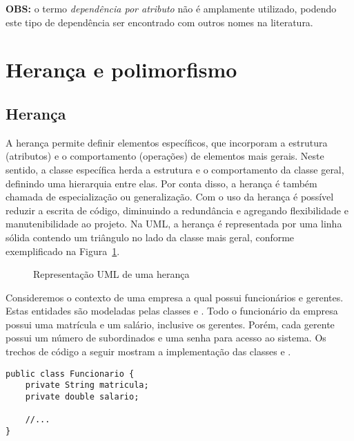 \textbf{OBS:} o termo \textit{dependência por atributo} não é amplamente utilizado, podendo este tipo de dependência ser encontrado com outros nomes na literatura.


\section{Herança e polimorfismo}

\subsection{Herança}

A herança permite definir elementos específicos, que incorporam a estrutura (atributos) e o comportamento (operações) de elementos mais gerais. Neste sentido, a classe específica herda a estrutura e o comportamento da classe geral, definindo uma hierarquia entre elas. Por conta disso, a herança é também chamada de especialização ou generalização. Com o uso da herança é possível reduzir a escrita de código, diminuindo a redundância e agregando flexibilidade e manutenibilidade ao projeto. Na UML, a herança é representada por uma linha sólida contendo um triângulo no lado da classe mais geral, conforme exemplificado na Figura~\ref{fig:exemplo-heranca-uml}.

\begin{figure}[h]
	\centering
	
	
	\caption{Representação UML de uma herança}
	\label{fig:exemplo-heranca-uml}
\end{figure}

Consideremos o contexto de uma empresa a qual possui funcionários e gerentes. Estas entidades são modeladas pelas classes  e . Todo o funcionário da empresa possui uma matrícula e um salário, inclusive os gerentes. Porém, cada gerente possui um número de subordinados e uma senha para acesso ao sistema. Os trechos de código a seguir mostram a implementação das classes  e .
 
\begin{verbatim}
public class Funcionario {
	private String matricula;
	private double salario;

	//...
}
\end{verbatim}
 
